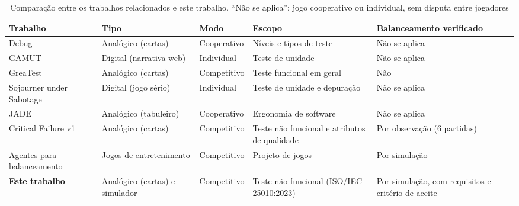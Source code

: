 \begin{table}[ht]
  \centering
  \caption{Comparação entre os trabalhos relacionados e este trabalho. ``Não se aplica'': jogo
    cooperativo ou individual, sem disputa entre jogadores}
  \label{tab:relacionados}
  \small
  \begin{tabularx}{\linewidth}{>{\raggedright\arraybackslash}p{3.9cm} >{\raggedright\arraybackslash}p{2.2cm}
      >{\raggedright\arraybackslash}p{1.9cm} >{\raggedright\arraybackslash}X >{\raggedright\arraybackslash}p{2.5cm}}
    \toprule
    Trabalho & Tipo & Modo & Escopo & Balanceamento verificado \\
    \midrule
    Debug \cite{costa2024debug} & Analógico (cartas) & Cooperativo & Níveis e tipos de teste & Não se aplica \\
    GAMUT \cite{gomes2021gamut} & Digital (narrativa web) & Individual & Teste de unidade & Não se aplica \\
    GreaTest \cite{beppe2018greatest} & Analógico (cartas) & Competitivo & Teste funcional em geral & Não \\
    Sojourner under Sabotage \cite{straubinger2025sojourner} & Digital (jogo sério) & Individual & Teste de unidade e depuração & Não se aplica \\
    JADE \cite{jeandaubias2023jade} & Analógico (tabuleiro) & Cooperativo & Ergonomia de software & Não se aplica \\
    Critical Failure v1 \cite{oliveira2025critical} & Analógico (cartas) & Competitivo & Teste não funcional e atributos de qualidade & Por observação (6 partidas) \\
    Agentes para balanceamento \cite{jaffe2012} \cite{silva2017ttr} \cite{volz2016} & Jogos de entretenimento & Competitivo & Projeto de jogos & Por simulação \\
    \textbf{Este trabalho} & Analógico (cartas) e simulador & Competitivo & Teste não funcional (ISO/IEC 25010:2023) & Por simulação, com requisitos e critério de aceite \\
    \bottomrule
  \end{tabularx}
\end{table}

